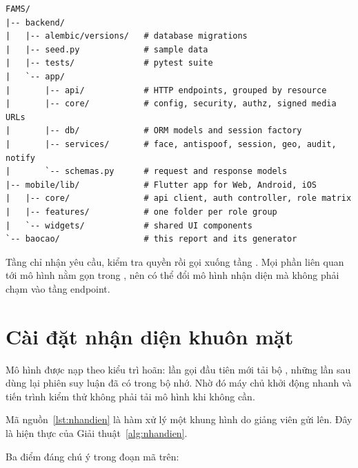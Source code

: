 \begin{lstlisting}[caption={Cấu trúc thư mục của kho mã nguồn.}, label={lst:caytm}]
FAMS/
|-- backend/
|   |-- alembic/versions/   # database migrations
|   |-- seed.py             # sample data
|   |-- tests/              # pytest suite
|   `-- app/
|       |-- api/            # HTTP endpoints, grouped by resource
|       |-- core/           # config, security, authz, signed media URLs
|       |-- db/             # ORM models and session factory
|       |-- services/       # face, antispoof, session, geo, audit, notify
|       `-- schemas.py      # request and response models
|-- mobile/lib/             # Flutter app for Web, Android, iOS
|   |-- core/               # api client, auth controller, role matrix
|   |-- features/           # one folder per role group
|   `-- widgets/            # shared UI components
`-- baocao/                 # this report and its generator
\end{lstlisting}

Tầng  chỉ nhận yêu cầu, kiểm tra quyền rồi gọi xuống tầng
. Mọi phần liên quan tới mô hình nằm gọn trong
, nên có thể đổi mô hình nhận diện mà không phải chạm vào
tầng endpoint.

\section{Cài đặt nhận diện khuôn mặt}

Mô hình được nạp theo kiểu trì hoãn: lần gọi đầu tiên mới tải bộ
, những lần sau dùng lại phiên suy luận đã có trong bộ nhớ.
Nhờ đó máy chủ khởi động nhanh và tiến trình kiểm thử không phải tải mô hình
khi không cần.

Mã nguồn~\ref{lst:nhandien} là hàm xử lý một khung hình do giảng viên gửi
lên. Đây là hiện thực của Giải thuật~\ref{alg:nhandien}.



Ba điểm đáng chú ý trong đoạn mã trên:

